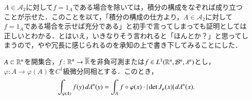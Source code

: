 \begin{dig}
$A \in \mathcal{A}_2$に対して$f = 1_A$である場合を除いては，積分の構成をなぞれば成り立つことが示せた．このことを以て，「積分の構成の仕方より，$A \in \mathcal{A}_2$に対して$f = 1_A$である場合を示せば充分である」と初手で言ってしまっても証明としては正しいとわかる．とはいえ，いきなりそう言われると「ほんとか？」と思ってしまうので，やや冗長に感じられるのを承知の上で書き下してみることにした．
\end{dig}

\begin{thm}\label{変数変換公式の弱い形}$A \subset \mathbb{R}^n$を開集合，$f \colon \mathbb{R}^n \to \overline{\mathbb{R}}$を非負可測または$f \in L^1(\mathbb{R}^n, \mathcal{B}^n ,\lambda^n)$とし，$\varphi \colon A \to \varphi(A)$を$C^1$級微分同相とする．このとき，
\begin{equation}
\int_{\varphi(A)} f(y) \mathop{}\!d\lambda^n(y) = \int_A f \circ \varphi(x) \cdot | \det J_\varphi(x) | \mathop{}\!d \lambda^n(x).
\end{equation}
\end{thm}

